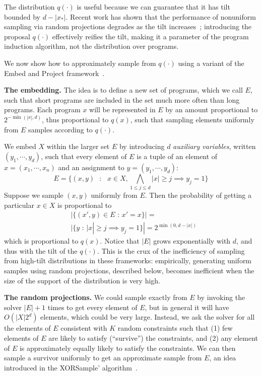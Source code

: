 \documentclass{article}
\begin{document}
The distribution $q(\cdot )$ is useful because we can guarantee that it has tilt bounded by
$d - |x_*|$.
Recent work has shown that the performance of nonuniform sampling via random projections degrades as the tilt increases~\cite{chakraborty2014distribution};
introducing the proposal $q(\cdot )$ effectively reifies the tilt,
making it a parameter of the program induction algorithm,
not the distribution over programs.

We now show how to approximately sample from $q(\cdot )$ using a variant of the Embed and Project framework~\cite{ermon2013embed}.

\textbf{The embedding.} The idea is to define a new set of programs, which we call $E$, such that short programs are included in the set much more often than long programs.
Each program $x$ will be represented in $E$ by an amount proportional to $2^{-\min (|x|,d)}$, thus proportional to $q(x)$,
such that sampling elements uniformly from $E$  samples according to $q(\cdot )$.

We embed $X$ within the larger set $E$ by introducing $d$ \emph{auxiliary variables}, written $(y_1,\cdots, y_d)$,
such that every element of $E$ is a tuple of an element of $x = (x_1,\cdots , x_n )$ and an assignment to $y = (y_1,\cdots, y_d)$:
  \begin{equation}
    E = \{(x,y) \text{ }:\text{ } x\in X,  \bigwedge_{1\leq j \leq d} |x|\geq j\implies y_j=1 \}
  \end{equation}
  Suppose we sample $(x,y)$ uniformly from $E$.
  Then the probability of getting a particular $x\in X$ is proportional to
  \begin{align}
   & |\{(x',y)\in E \text{ : } x' = x\}| = \nonumber \\
    &| \{y\text{ : } |x|\geq j\implies y_j=1\}|=2^{\min (0,d-|x|)}
    \end{align}
  which is proportional to $q(x)$. Notice that $|E|$ grows exponentially with $d$, and thus with the tilt of the $q(\cdot )$. This is the crux of the inefficiency of sampling from high-tilt distributions in these frameworks:
  empirically, generating uniform samples using random projections, described below, becomes inefficient when the size of the support of the distribution is very high.

  \textbf{The random projections.} We  could sample exactly from $E$  by invoking the solver $|E|+1$ times to get every element of $E$,
  but in general it will have $O(|X|2^d)$ elements, which could be very large.
  Instead, we ask the solver for all the elements of $E$ consistent with $K$ random constraints
  such that (1) few elements of $E$ are likely to satisfy (``survive'') the constraints,
  and (2) any element of $E$ is approximately equally likely to satisfy the constraints.
  We can then sample a survivor uniformly to get an approximate sample from $E$, an idea introduced in the XORSample' algorithm~\cite{gomes2006near}.
\end{document}

